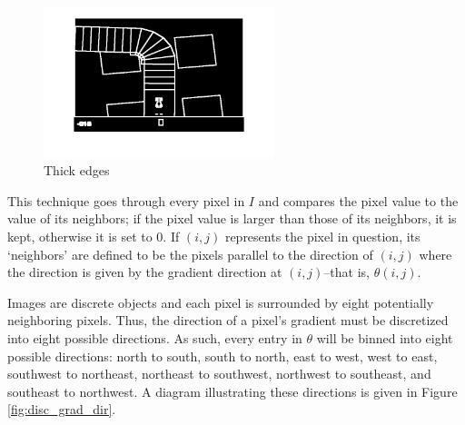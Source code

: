 \begin{figure}[h]
\centering
\includegraphics[width=0.6\textwidth]{Graphics/thick_edges_example.png}
\caption{Thick edges}
\label{fig:thick_edges_example}
\end{figure}

This technique goes through every pixel in $I$ and compares the pixel
value to the value of its neighbors; if the pixel value is larger
than those of its neighbors, it is kept, otherwise it is set to 0. 
If $(i,j)$ represents the pixel in question, its `neighbors' are defined
to be the pixels parallel to the direction of $(i,j)$ where the
direction is given by the gradient direction at $(i,j)$--that is, 
$\theta(i,j)$. 

\par
Images are discrete objects and each pixel is surrounded by eight
potentially neighboring pixels. Thus, the direction of a pixel's gradient
must be discretized into eight possible directions. As such, every entry
in $\theta$ will be binned into eight possible directions: north to south, 
south to north, east to west, west to east, southwest to northeast, 
northeast to southwest, northwest to southeast, and southeast to 
northwest. A diagram illustrating these directions is given in 
Figure \ref{fig:disc_grad_dir}. 

